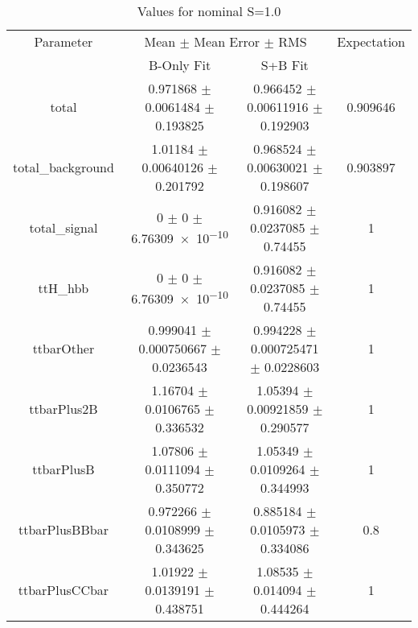 \begin{table}
\centering
\caption{Values for nominal S=1.0}
\begin{tabular}{cccc}
\toprule
Parameter & \multicolumn{2}{c}{Mean $\pm$ Mean Error $\pm$ RMS} & Expectation\\
 & B-Only Fit & S+B Fit & \\
\midrule
total & \num{0.971868} $\pm$ \num{0.0061484} $\pm$ \num{0.193825} & \num{0.966452} $\pm$ \num{0.00611916} $\pm$ \num{0.192903} & \num{0.909646}\\
total\_background & \num{1.01184} $\pm$ \num{0.00640126} $\pm$ \num{0.201792} & \num{0.968524} $\pm$ \num{0.00630021} $\pm$ \num{0.198607} & \num{0.903897}\\
total\_signal & \num{0} $\pm$ \num{0} $\pm$ \num{6.76309e-10} & \num{0.916082} $\pm$ \num{0.0237085} $\pm$ \num{0.74455} & \num{1}\\
ttH\_hbb & \num{0} $\pm$ \num{0} $\pm$ \num{6.76309e-10} & \num{0.916082} $\pm$ \num{0.0237085} $\pm$ \num{0.74455} & \num{1}\\
ttbarOther & \num{0.999041} $\pm$ \num{0.000750667} $\pm$ \num{0.0236543} & \num{0.994228} $\pm$ \num{0.000725471} $\pm$ \num{0.0228603} & \num{1}\\
ttbarPlus2B & \num{1.16704} $\pm$ \num{0.0106765} $\pm$ \num{0.336532} & \num{1.05394} $\pm$ \num{0.00921859} $\pm$ \num{0.290577} & \num{1}\\
ttbarPlusB & \num{1.07806} $\pm$ \num{0.0111094} $\pm$ \num{0.350772} & \num{1.05349} $\pm$ \num{0.0109264} $\pm$ \num{0.344993} & \num{1}\\
ttbarPlusBBbar & \num{0.972266} $\pm$ \num{0.0108999} $\pm$ \num{0.343625} & \num{0.885184} $\pm$ \num{0.0105973} $\pm$ \num{0.334086} & \num{0.8}\\
ttbarPlusCCbar & \num{1.01922} $\pm$ \num{0.0139191} $\pm$ \num{0.438751} & \num{1.08535} $\pm$ \num{0.014094} $\pm$ \num{0.444264} & \num{1}\\
\bottomrule
\end{tabular}
\end{table}